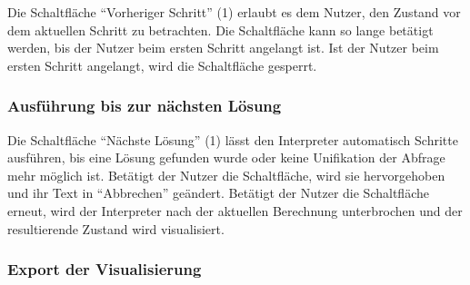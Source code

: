 \documentclass[parskip=full,11pt,twoside]{scrartcl}
\begin{document}
\begin{minipage}{\linewidth}
\end{minipage}

\begin{minipage}{\linewidth}
\end{minipage}

Die Schaltfläche \enquote{Vorheriger Schritt} (1) erlaubt es dem Nutzer, den Zustand vor dem aktuellen Schritt zu betrachten.
Die Schaltfläche kann so lange betätigt werden, bis der Nutzer beim ersten Schritt angelangt ist.
Ist der Nutzer beim ersten Schritt angelangt, wird die Schaltfläche gesperrt.

\subsubsection{Ausführung bis zur nächsten Lösung}

\begin{minipage}{\linewidth}
\end{minipage}

\begin{minipage}{\linewidth}
\end{minipage}

Die Schaltfläche \enquote{Nächste Lösung} (1) lässt den Interpreter automatisch Schritte ausführen, bis eine Lösung gefunden wurde oder keine Unifikation der Abfrage mehr möglich ist.
Betätigt der Nutzer die Schaltfläche, wird sie hervorgehoben und ihr Text in \enquote{Abbrechen} geändert.
Betätigt der Nutzer die Schaltfläche erneut, wird der Interpreter nach der aktuellen Berechnung unterbrochen und der resultierende Zustand wird visualisiert.

\subsubsection{Export der Visualisierung}
\end{document}
